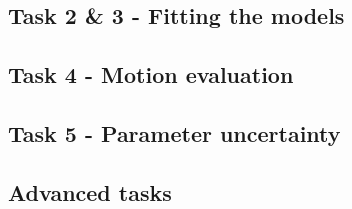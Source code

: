 \documentclass[11pt,a4paper,oneside]{report}
\begin{document}
\subsection*{Task 2 & 3 - Fitting the models}



\subsection*{Task 4 - Motion evaluation}

\subsection*{Task 5 - Parameter uncertainty}

\subsection*{Advanced tasks}
\end{document}
